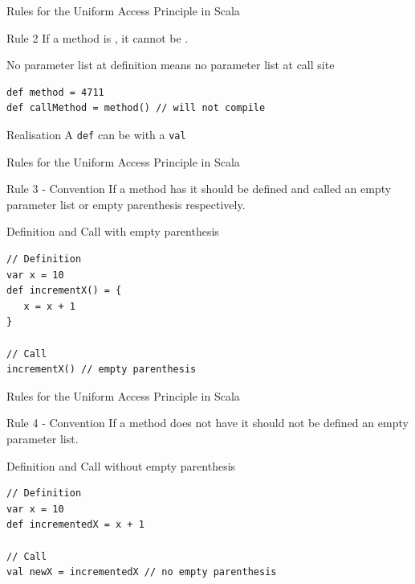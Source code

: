 \begin{frame}[fragile]{Rules for the Uniform Access Principle in Scala}
\begin{block}{Rule 2}
If a method is , it \alert{cannot}
be .
\end{block}
\pause
\begin{alertblock}{No parameter list at definition means no parameter list at
call site}
\begin{lstlisting}
def method = 4711
def callMethod = method() // will not compile
\end{lstlisting}
\end{alertblock}
\pause
\begin{block}{Realisation}
A \lstinline!def! can be  with a \lstinline!val!
\end{block}
\end{frame}

\begin{frame}[fragile]{Rules for the Uniform Access Principle in Scala}
\begin{block}{Rule 3 - Convention}
If a method \alert{has}  it \alert{should} be
defined \alert{and} called  an empty parameter list or empty
parenthesis respectively.
\end{block}
\pause
\begin{exampleblock}{Definition and Call with empty parenthesis}
\begin{lstlisting}
// Definition
var x = 10
def incrementX() = {
   x = x + 1
}

// Call
incrementX() // empty parenthesis
\end{lstlisting}
\end{exampleblock}
\end{frame}

\begin{frame}[fragile]{Rules for the Uniform Access Principle in Scala}
\begin{block}{Rule 4 - Convention}
If a method \alert{does not have}  it \alert{should not}
be defined  an empty parameter list.
\end{block}
\pause
\begin{exampleblock}{Definition and Call without empty parenthesis}
\begin{lstlisting}
// Definition
var x = 10
def incrementedX = x + 1

// Call
val newX = incrementedX // no empty parenthesis
\end{lstlisting}
\end{exampleblock}
\end{frame}

